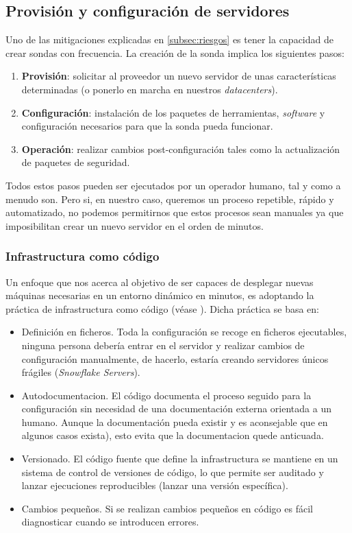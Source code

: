 \subsection{Provisión y configuración de servidores}
\label{subsec:server-config}

Uno de las mitigaciones explicadas en \ref{subsec:riesgos} es tener la capacidad de crear sondas con frecuencia. La creación de la sonda implica
los siguientes pasos:

\begin{enumerate}
    \item \textbf{Provisión}: solicitar al proveedor un nuevo servidor de unas características determinadas (o ponerlo en marcha en nuestros \emph{datacenters}).
    \item \textbf{Configuración}: instalación de los paquetes de herramientas, \emph{software} y configuración necesarios para que la sonda pueda funcionar.
    \item \textbf{Operación}: realizar cambios post-configuración tales como la actualización de paquetes de seguridad.
\end{enumerate}

Todos estos pasos pueden ser ejecutados por un operador humano, tal y como a menudo son. Pero si, en nuestro caso, queremos un proceso repetible, rápido y automatizado,
no podemos permitirnos que estos procesos sean manuales ya que imposibilitan crear un nuevo servidor en el orden de minutos.

\subsubsection{Infrastructura como código}
\label{subsec:infra-as-code}

Un enfoque que nos acerca al objetivo de ser capaces de desplegar nuevas máquinas necesarias en un entorno dinámico en minutos, es adoptando la práctica
de infrastructura como código (véase \cite{fowler-infra-as-code}). Dicha práctica se basa en:

\begin{itemize}
    \item Definición en ficheros. Toda la configuración se recoge en ficheros ejecutables, ninguna persona debería entrar en el servidor
    y realizar cambios de configuración manualmente, de hacerlo, estaría creando servidores únicos frágiles (\emph{Snowflake Servers}).
    \item Autodocumentacion. El código documenta el proceso seguido para la configuración sin necesidad de una documentación externa orientada a un humano. Aunque la documentación pueda existir y es aconsejable que en algunos casos exista), esto evita que la documentacion quede anticuada.
    \item Versionado. El código fuente que define la infrastructura se mantiene en un sistema de control de versiones de código, lo que permite ser auditado y lanzar ejecuciones reproducibles (lanzar una versión específica).
    \item Cambios pequeños. Si se realizan cambios pequeños en código es fácil diagnosticar cuando se introducen errores.
\end{itemize}
 
